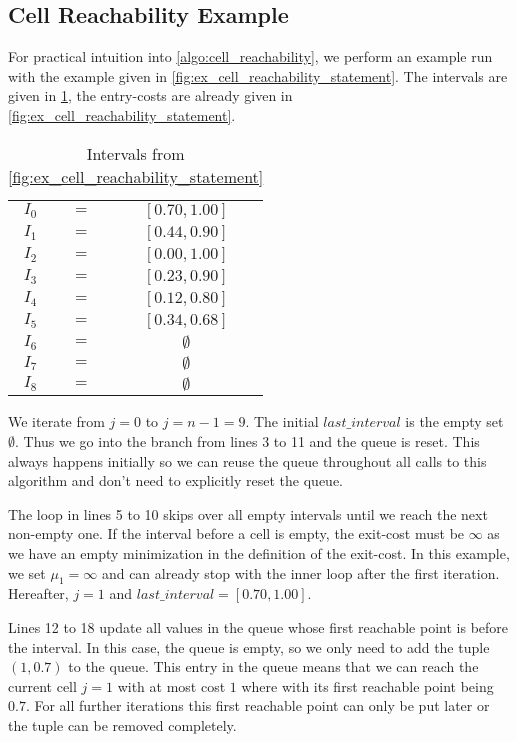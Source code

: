 \subsection{Cell Reachability Example}
\label{ssec:cell_reachability_ex}

For practical intuition into \cref{algo:cell_reachability}, we perform an example run with the example given in \cref{fig:ex_cell_reachability_statement}. The intervals are given in \cref{tab:cell_reachability_intervals}, the entry-costs are already given in \cref{fig:ex_cell_reachability_statement}.

\begin{table}[htb]
  \centering
	\begin{tabular}{|ccc|}
		\hline
		\(I_0\) & \(=\) & \([0.70, 1.00]\) \\
		\(I_1\) & \(=\) & \([0.44, 0.90]\) \\
		\(I_2\) & \(=\) & \([0.00, 1.00]\) \\
		\(I_3\) & \(=\) & \([0.23, 0.90]\) \\
		\(I_4\) & \(=\) & \([0.12, 0.80]\) \\
		\(I_5\) & \(=\) & \([0.34, 0.68]\) \\
		\(I_6\) & \(=\) & \(\emptyset\) \\ 
		\(I_7\) & \(=\) & \(\emptyset\) \\
		\(I_8\) & \(=\) & \(\emptyset\) \\
		\hline
	\end{tabular}
	\caption{Intervals from \cref{fig:ex_cell_reachability_statement}}
	\label{tab:cell_reachability_intervals}
\end{table}

We iterate from \(j = 0\) to \(j = n - 1 = 9\). The initial \(last\_interval\) is the empty set \(\emptyset\). Thus we go into the branch from lines 3 to 11 and the queue is reset. This always happens initially so we can reuse the queue throughout all calls to this algorithm and don't need to explicitly reset the queue. 

The loop in lines 5 to 10 skips over all empty intervals until we reach the next non-empty one. If the interval before a cell is empty, the exit-cost must be \(\infty\) as we have an empty minimization in the definition of the exit-cost. In this example, we set \(\mu_1 = \infty\) and can already stop with the inner loop after the first iteration. Hereafter, \(j = 1\) and \(last\_interval = [0.70, 1.00]\). 

Lines 12 to 18 update all values in the queue whose first reachable point is before the interval. In this case, the queue is empty, so we only need to add the tuple \((1, 0.7)\) to the queue. This entry in the queue means that we can reach the current cell \(j = 1\) with at most cost \(1\) where with its first reachable point being \(0.7\). For all further iterations this first reachable point can only be put later or the tuple can be removed completely. 


